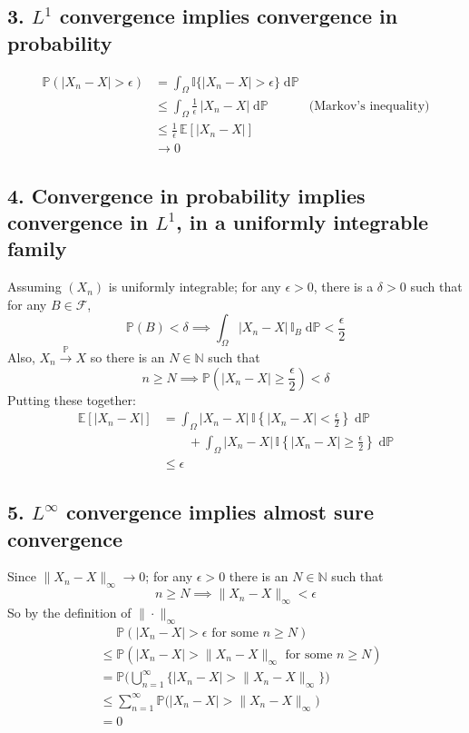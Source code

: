 \documentclass{article}
\newcommand \dP {\;\mathrm{d}\mathbb{P}}
\begin{document}
\subsection*{3. $L^1$ convergence implies convergence in probability}
\begin{align*}
  \mathbb{P}(|X_n - X| > \epsilon)
  &= \int_\Omega \mathbb{I}\{|X_n - X| > \epsilon\} \dP \\
  &\leq \int_\Omega \frac{1}{\epsilon} \, |X_n - X| \dP & \text{(Markov's inequality)} \\
  &\leq \frac{1}{\epsilon} \, \mathbb{E}[|X_n - X|] \\
  &\to 0
\end{align*}

\subsection*{4. Convergence in probability implies convergence in $L^1$,
in a uniformly integrable family}
Assuming $(X_n)$ is uniformly integrable; for any $\epsilon > 0$,
there is a $\delta > 0$ such that for
any $B \in \mathcal{F}$,
$$\mathbb{P}(B) < \delta \implies \int_\Omega |X_n - X| \, \mathbb{I}_B \dP < \frac{\epsilon}{2}$$
%
Also, $X_n \xrightarrow{\mathbb{P}} X$ so there is an $N \in \mathbb{N}$ such that
$$n \geq N \implies \mathbb{P}\left(|X_n - X| \geq \frac{\epsilon}{2}\right) < \delta$$
%
Putting these together:
\begin{align*}
  \mathbb{E}[|X_n - X|]
  &= \int_\Omega |X_n - X| \, \mathbb{I}\left\{|X_n - X| < \frac{\epsilon}{2}\right\} \dP \\
  &\qquad + \int_\Omega |X_n - X| \, \mathbb{I}\left\{|X_n - X| \geq \frac{\epsilon}{2}\right\} \dP \\
  &\leq \epsilon
\end{align*}



\subsection*{5. $L^\infty$ convergence implies almost sure convergence}
Since $\|X_n - X\|_\infty \to 0$;
for any $\epsilon>0$ there is an $N \in \mathbb{N}$ such that
$$n \geq N \implies \|X_n - X\|_\infty < \epsilon$$
%
So by the definition of $\|\cdot\|_\infty$
\begin{align*}
  &\quad \,\, \mathbb{P}(|X_n - X| > \epsilon \text{ for some } n \geq N) \\
  &\leq \mathbb{P}(|X_n - X| > \|X_n - X\|_\infty \text{ for some } n \geq N) \\
  &= \mathbb{P}\Big(\bigcup_{n=1}^\infty \big\{|X_n - X| > \|X_n - X\|_\infty \big\} \Big) \\
  &\leq \sum_{n=1}^\infty \mathbb{P}\big(|X_n - X| > \|X_n - X\|_\infty \big) \\
  &= 0
\end{align*}
\end{document}
